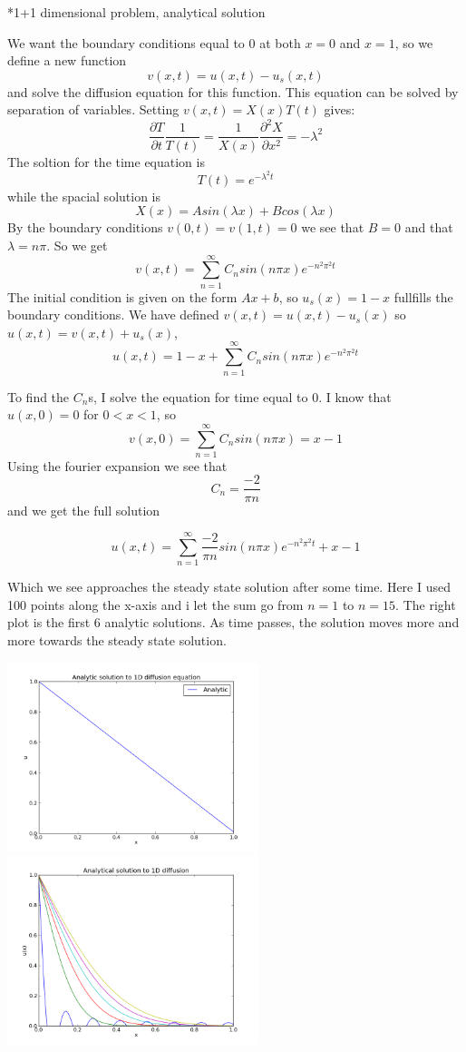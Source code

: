 \documentclass[a4paper, 12pt, titlepage]{article}
\newcommand{\f}[2]{\frac{#1}{#2}}
\newcommand{\beq}{\begin{equation*}}
\newcommand{\eeq}{\end{equation*}}
\newcommand{\pa}{\partial}
\begin{document}
 \begin{section}*{1+1 dimensional problem, analytical solution}
 
    We want the boundary conditions equal to $0$ at both $x=0$ and $x=1$, so we define a new function 
    \beq v(x,t) = u(x,t) - u_s(x,t) \eeq
    and solve the diffusion equation for this function. This equation can be solved by separation of
    variables. Setting $v(x,t) = X(x)T(t)$ gives:
    \beq \f{\pa T}{\pa t} \f{1}{T(t)} = \f{1}{X(x)} \f{\pa ^2 X}{\pa x^2} = -\lambda ^2\eeq
    The soltion for the time equation is \beq T(t) = e^{-\lambda ^2 t} \eeq while the spacial solution is
    \beq X(x) = Asin(\lambda x) + Bcos(\lambda x) \eeq
    By the boundary conditions $v(0,t) = v(1,t) = 0$ we see that $B = 0$ and that $\lambda = n\pi$. 
    So we get \beq v(x,t) = \sum_{n=1}^{\infty} C_n sin(n\pi x) e^{-n^2\pi ^2 t} \eeq
    The initial condition is given on the form $Ax + b$, so $u_s(x) = 1-x$ fullfills the boundary conditions. 
    We have defined $v(x,t) = u(x,t) - u_s(x)$ so $u(x,t) = v(x,t) + u_s(x)$, 
    \beq u(x,t) = 1 - x + \sum_{n=1}^{\infty} C_n sin(n\pi x)e^{-n^2\pi ^2 t}  \eeq 
    
    To find the $C_n$s, I solve the equation for time equal to 0. I know that $u(x,0) = 0$ for $0<x<1$, so
    \beq v(x,0) = \sum_{n=1}^{\infty} C_n sin(n\pi x) = x - 1 \eeq
    Using the fourier expansion we see that \beq C_n = \f{-2}{\pi n} \eeq and we get the full solution
    
    \beq u(x,t) = \sum_{n=1}^{\infty} \f{-2}{\pi n} sin(n\pi x) e^{-n^2\pi ^2 t} + x - 1 \eeq
    
    Which we see approaches the steady state solution after some time. Here I used 100 points along the 
    x-axis and i let the sum go from $n=1$ to $n=15$. The right plot is the first 6 analytic solutions. As time passes, the solution moves more 
    and more towards the steady state solution.
    
    \includegraphics[width=0.55\textwidth]{build-main-Desktop-Debug/Analytic_1d.png}
    \includegraphics[width=0.55\textwidth]{build-main-Desktop-Debug/Analytic_1d_first6.png}
    
     
 \end{section}
\end{document}
